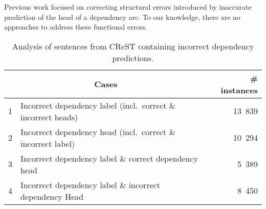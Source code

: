 Previous work focused on correcting structural errors introduced by inaccurate prediction of the head of a dependency arc. %
To our knowledge, there are no approaches to address these functional errors.

 

\begin{table}[!t]
\centering
\begin{tabular}{l|l|r}
\multicolumn{2}{c|}{Cases} & \# instances \\ \hline
 
1 & \multicolumn{1}{l|}{Incorrect dependency label (incl.\ correct \& incorrect heads)} &  13~839\\
2 & \multicolumn{1}{l|}{Incorrect dependency head (incl.\ correct \& incorrect label)} &  10~294\\
3 & \multicolumn{1}{l|}{Incorrect dependency label \& correct dependency head} & 5~389 \\
4 & \multicolumn{1}{l|}{Incorrect dependency label \& incorrect dependency Head} &  8~450\\
\hline
\end{tabular}
\caption{Analysis of sentences from CReST containing  incorrect dependency predictions.}
\label{tab:initanalysis}
\end{table}


